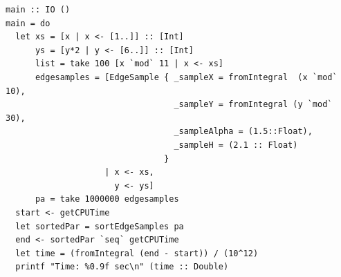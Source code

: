 \documentclass[12pt, a4paper]{article}
\begin{document}
\begin{lstlisting}[label={lst:sorting}]
main :: IO ()
main = do
  let xs = [x | x <- [1..]] :: [Int]
      ys = [y*2 | y <- [6..]] :: [Int]
      list = take 100 [x `mod` 11 | x <- xs]
      edgesamples = [EdgeSample { _sampleX = fromIntegral  (x `mod` 10),
                                  _sampleY = fromIntegral (y `mod` 30),
                                  _sampleAlpha = (1.5::Float),
                                  _sampleH = (2.1 :: Float)
                                }
                    | x <- xs,
                      y <- ys]
      pa = take 1000000 edgesamples
  start <- getCPUTime
  let sortedPar = sortEdgeSamples pa
  end <- sortedPar `seq` getCPUTime
  let time = (fromIntegral (end - start)) / (10^12)
  printf "Time: %0.9f sec\n" (time :: Double)
\end{lstlisting}
\end{document}
